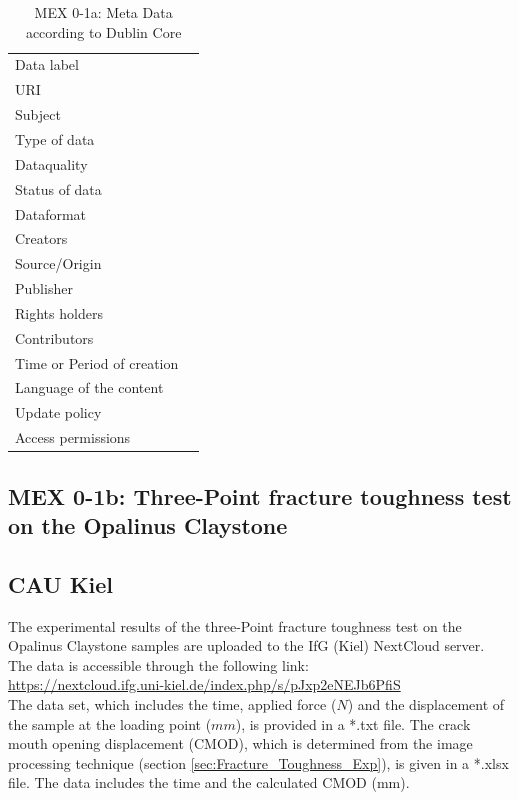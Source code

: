 \begin{table}[h!]
\caption{MEX 0-1a: Meta Data according to Dublin Core}
\label{tab:}
\small
\begin{tabular}{R{3cm}|L{7cm}}
\hline
%
Data label &  \\
URI &  \\
Subject  &  \\
Type of data  &  \\
Dataquality  &  \\
Status of data  &  \\
Dataformat  & \\
Creators  &  \\
Source/Origin &  \\
Publisher  &  \\
Rights holders &  \\
Contributors &  \\
Time or Period of creation &  \\
Language of the content &  \\
Update policy &  \\
Access permissions &  \\
%
\hline
\end{tabular}
\end{table}

\subsection{MEX 0-1b: Three-Point fracture toughness test on the Opalinus Claystone}

\subsection*{CAU Kiel}

The experimental results of the three-Point fracture toughness test on the Opalinus Claystone samples are uploaded to the IfG (Kiel) NextCloud server. The data is accessible through the following link:\\
\hyperlink{https://nextcloud.ifg.uni-kiel.de/index.php/s/pJxp2eNEJb6PfiS}{https://nextcloud.ifg.uni-kiel.de/index.php/s/pJxp2eNEJb6PfiS}\\

The data set, which includes the time, applied force ($N$) and the displacement of the sample at the loading point ($mm$), is provided in a *.txt file. The crack mouth opening displacement (CMOD), which is determined from the image processing technique (section \ref {sec:Fracture_Toughness_Exp}), is given in a *.xlsx file. The data includes the time and the calculated CMOD (mm). 


